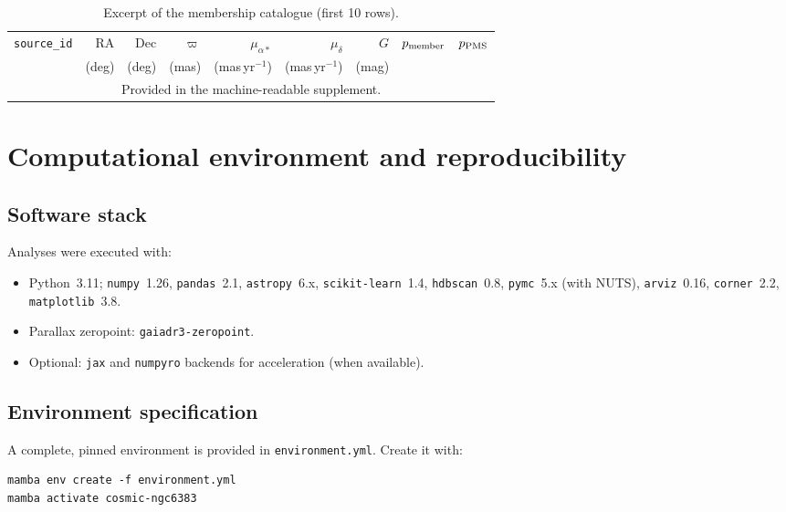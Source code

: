 \documentclass[../main.tex]{subfiles}
\begin{document}
\begin{table*}[h]
  \centering
  \caption{Excerpt of the membership catalogue (first 10 rows).}
  \label{tab:app_catalog_excerpt}
  \begin{tabular}{lrrrrrrrr}
    \toprule
    \texttt{source\_id} & RA & Dec & $\varpi$ & $\mu_{\alpha*}$ & $\mu_\delta$ & $G$ & $p_{\rm member}$ & $p_{\rm PMS}$ \\
    & (deg) & (deg) & (mas) & (mas\,yr$^{-1}$) & (mas\,yr$^{-1}$) & (mag) &  &  \\
    \midrule
    \multicolumn{9}{c}{Provided in the machine-readable supplement.}\\
    \bottomrule
  \end{tabular}
\end{table*}

\section{Computational environment and reproducibility}
\label{app:repro}

\subsection{Software stack}
Analyses were executed with:
\begin{itemize}
  \item Python~3.11; \texttt{numpy}~1.26, \texttt{pandas}~2.1, \texttt{astropy}~6.x, \texttt{scikit-learn}~1.4, \texttt{hdbscan}~0.8,
  \texttt{pymc}~5.x (with NUTS), \texttt{arviz}~0.16, \texttt{corner}~2.2, \texttt{matplotlib}~3.8.
  \item Parallax zeropoint: \texttt{gaiadr3-zeropoint}.
  \item Optional: \texttt{jax} and \texttt{numpyro} backends for acceleration (when available).
\end{itemize}

\subsection{Environment specification}
A complete, pinned environment is provided in \verb|environment.yml|. Create it with:
\begin{verbatim}
mamba env create -f environment.yml
mamba activate cosmic-ngc6383
\end{verbatim}
\end{document}
